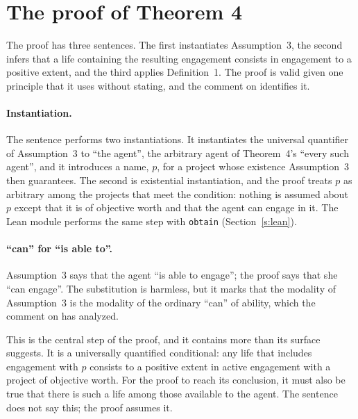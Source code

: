 \section{The proof of Theorem 4}\label{s:proof}

The proof has three sentences. The first instantiates Assumption~3, the second infers that a life containing the resulting engagement consists in engagement to a positive extent, and the third applies Definition~1. The proof is valid given one principle that it uses without stating, and the comment on  identifies it.


\paragraph{Instantiation.} The sentence performs two instantiations. It instantiates the universal quantifier of Assumption~3 to \enquote{the agent}, the arbitrary agent of Theorem~4's \enquote{every such agent}, and it introduces a name, $p$, for a project whose existence Assumption~3 then guarantees. The second is existential instantiation, and the proof treats $p$ as arbitrary among the projects that meet the condition: nothing is assumed about $p$ except that it is of objective worth and that the agent can engage in it. The Lean module performs the same step with \texttt{obtain} (Section~\ref{s:lean}).

\paragraph{\enquote{can} for \enquote{is able to}.} Assumption~3 says that the agent \enquote{is able to engage}; the proof says that she \enquote{can engage}. The substitution is harmless, but it marks that the modality of Assumption~3 is the modality of the ordinary \enquote{can} of ability, which the comment on  has analyzed.


This is the central step of the proof, and it contains more than its surface suggests. It is a universally quantified conditional: any life that includes engagement with $p$ consists to a positive extent in active engagement with a project of objective worth. For the proof to reach its conclusion, it must also be true that there is such a life among those available to the agent. The sentence does not say this; the proof assumes it.

